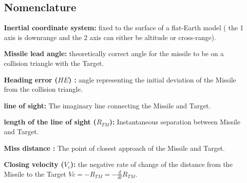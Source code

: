 \subsection*{Nomenclature}

\textbf{Inertial coordinate system:} fixed to the surface of a flat-Earth model ( the 1 axis is downrange and the 2 axis can either be altitude or cross-range).

\textbf{Missile lead angle:} theoretically correct angle
for the missile to be on a collision triangle with the Target.

\textbf{Heading error ($HE$) :} angle representing the initial deviation of the Missile from the collision triangle.

\textbf{line of sight:} The imaginary line connecting the Missile and Target.

\textbf{length of the line of sight ($R_{TM}$):} Instantaneous separation between Missile and Target.

\textbf{Miss distance :} The point of closest approach of the Missile and Target.

\textbf{Closing velocity ($V_c$):} the negative rate of change of the distance
from the Missile to the Target $Vc= -\dot{R_{TM}}=-\frac{d}{dt} R_{TM} $.


